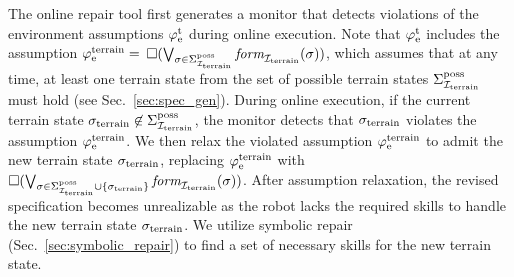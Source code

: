 \documentclass[letterpaper, 10 pt, conference]{ieeeconf}
\begin{document}
The online repair tool first generates a monitor that detects violations of the environment assumptions $\varphi_\textrm{e}^\textrm{t}$ during online execution.
%
Note that $\varphi_\textrm{e}^\textrm{t}$ includes the assumption
$\varphi_\textrm{e}^\textrm{terrain} = $ $
    \square (
    \bigvee_{\sigma\in\Sigma_{{\mathcal I}_{\textrm{terrain}}}^{\textrm{poss}}}
    \textit{form}_{{\mathcal I}_{\textrm{terrain}}}(\sigma))$,
which assumes that 
at any time, 
at least one terrain state from the set of possible terrain states $\Sigma_{{\mathcal I}_{\textrm{terrain}}}^{\textrm{poss}}$ must hold
(see Sec.~\ref{sec:spec_gen}).
During online execution,
if the current terrain state $\sigma_{\textrm{terrain}} \not\in \Sigma_{{\mathcal I}_{\textrm{terrain}}}^{\textrm{poss}}$,
the monitor detects that $\sigma_{\textrm{terrain}}$
violates the assumption $\varphi_\textrm{e}^\textrm{terrain}$.
We then relax the violated assumption $\varphi_\textrm{e}^\textrm{terrain}$ to admit the new terrain state $\sigma_{\textrm{terrain}}$,
replacing $\varphi_\textrm{e}^\textrm{terrain}$ with 
$\square (
    \bigvee_{\sigma\in\Sigma_{{\mathcal I}_{\textrm{terrain}}}^{\textrm{poss}}\cup\{\sigma_{\textrm{terrain}}\}}
    \textit{form}_{{\mathcal I}_{\textrm{terrain}}}(\sigma))$.
After assumption relaxation,
the revised specification becomes unrealizable
as the robot lacks the required skills to handle the new terrain state $\sigma_{\textrm{terrain}}$.
We utilize symbolic repair 
(Sec.~\ref{sec:symbolic_repair})
to find a set of necessary skills for the new terrain state.






\end{document}
